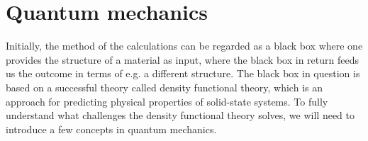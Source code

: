 \section{Quantum mechanics}

Initially, the method of the calculations can be regarded as a black box where one provides the structure of a material as input, where the black box in return feeds us the outcome in terms of e.g. a different structure. The black box in question is based on a successful theory called density functional theory, which is an approach for predicting physical properties of solid-state systems. %
To fully understand what challenges the density functional theory solves, we will need to introduce a few concepts in quantum mechanics.


